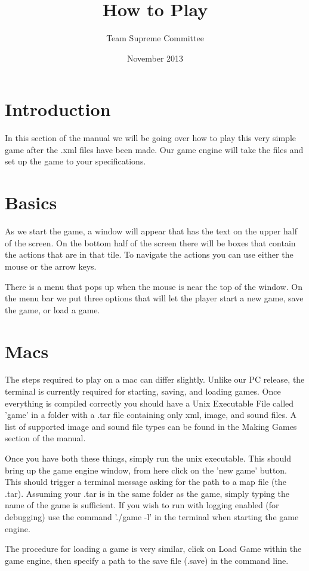 \documentclass[11pt]{article}
\begin{document}
\title{How to Play}
\author{Team Supreme Committee}
\date{November 2013}
\maketitle


\section{Introduction}

In this section of the manual we will be going over how to play this very simple game after the .xml files have been made. Our game engine will take the files and set up the game to your specifications. 

\section{Basics}

As we start the game, a window will appear that has the text on the upper half of the screen. On the bottom half of the screen there will be boxes that contain the actions that are in that tile. To navigate the actions you can use either the mouse or the arrow keys.

There is a menu that pops up when the mouse is near the top of the window. On the menu bar we put three options that will let the player start a new game, save the game, or load a game.

\section{Macs}

The steps required to play on a mac can differ slightly. Unlike our PC release, the terminal is currently required for starting, saving, and loading games. Once everything is compiled correctly you should have a Unix Executable File called 'game' in a folder with a .tar file containing only xml, image, and sound files. A list of supported image and sound file types can be found in the Making Games section of the manual. 

Once you have both these things, simply run the unix executable. This should bring up the game engine window, from here click on the 'new game' button. This should trigger a terminal message asking for the path to a map file (the .tar). Assuming your .tar is in the same folder as the game, simply typing the name of the game is sufficient. If you wish to run with logging enabled (for debugging) use the command './game -l' in the terminal when starting the game engine. 

The procedure for loading a game is very similar, click on Load Game within the game engine, then specify a path to the save file (.save) in the command line.
\end{document}
